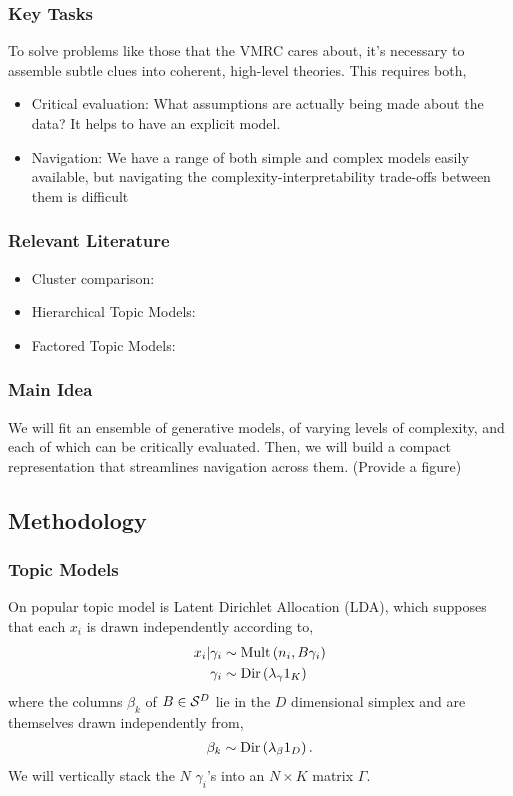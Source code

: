 \documentclass{beamer}
\begin{document}
\begin{frame}
  \frametitle{Key Tasks}
  To solve problems like those that the VMRC cares about, it's necessary to
  assemble subtle clues into coherent, high-level theories. This requires both,
  \begin{itemize}
    \item Critical evaluation: What assumptions are actually being made about
    the data? It helps to have an explicit model.
    \item Navigation: We have a range of both simple and complex models easily
    available, but navigating the complexity-interpretability trade-offs between
    them is difficult
  \end{itemize}
\end{frame}

\begin{frame}
  \frametitle{Relevant Literature}
  \begin{itemize}
    \item Cluster comparison:
    \item Hierarchical Topic Models:
    \item Factored Topic Models:
  \end{itemize}
\end{frame}

\begin{frame}
  \frametitle{Main Idea}
  We will fit an ensemble of generative models, of varying levels of complexity,
  and each of which can be critically evaluated. Then, we will build a compact
  representation that streamlines navigation across them.
  (Provide a figure)
\end{frame}

\subsection{Methodology}

\begin{frame}
  \frametitle{Topic Models}
  On popular topic model is Latent Dirichlet Allocation (LDA), which supposes
  that each $x_{i}$ is drawn independently according to,
  \begin{align*}
  x_i \vert \gamma_i &\sim \text{Mult}\left(n_{i}, B\gamma_{i}\right) \\
  \gamma_{i} &\sim \text{Dir}\left(\lambda_{\gamma} 1_{K}\right)
  \end{align*}
  where the columns $\beta_{k}$ of $B \in \mathcal{S}^{D}$ lie in the $D$
  dimensional simplex and are themselves drawn independently from,
  \begin{align*}
  \beta_{k} \sim \text{Dir}\left(\lambda_{\beta} 1_{D}\right).
\end{align*}
  We will vertically stack the $N$ $\gamma_i$'s into an $N \times K$ matrix
  $\Gamma$.
\end{frame}
\end{document}
